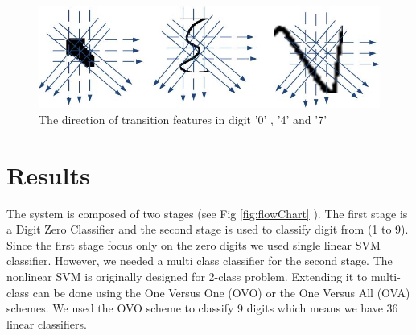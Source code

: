 \documentclass[10pt]{IEEEtran}
\begin{document}
 \begin{figure}
	\centering
		\includegraphics[scale=0.3]{Trans2}
	\caption[Transition features] {The direction of transition features in digit '0' , '4' and '7' }
	\label{fig:featTrans}
\end{figure}
%
%
%
%




\section {Results}
\label{sec:Results}

     The system is composed of two stages (see Fig \ref{fig:flowChart} ).  The first stage is a Digit Zero Classifier and the second stage is used to classify digit from (1  to 9). Since the first stage focus only on the zero digits we used single linear SVM classifier. However, we needed a multi class classifier for the second stage. The nonlinear SVM is originally designed for 2-class problem. Extending it to multi-class can be done using the One Versus One (OVO) or the One Versus All (OVA) schemes. We used the OVO scheme to classify 9 digits which means we have 36 linear classifiers.
\end{document}
